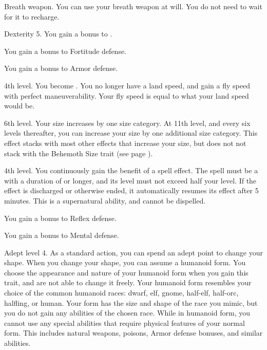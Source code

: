     \featpre Breath weapon.
    \featben You can use your breath weapon at will.
    You do not need to wait for it to recharge.

    \featpre Dexterity 5.
    \featben You gain a  bonus to .

    \featben You gain a  bonus to Fortitude defense.

    \featben You gain a  bonus to Armor defense.

    \featpre 4th level.
    \featben You become .
    You no longer have a land speed, and gain a fly speed with perfect maneuverability.
    Your fly speed is equal to what your land speed would be.

    \featpre 6th level.
    \featben Your size increases by one size category.
    At 11th level, and every six levels thereafter, you can increase your size by one additional size category.
    This effect stacks with most other effects that increase your size, but does not not stack with the Behemoth Size trait (see page ).

    \featpre 4th level.
    \featben You continuously gain the benefit of a spell effect.
    The spell must be a  with a duration of \durshort or longer, and its level must not exceed half your level.
    If the effect is discharged or otherwise ended, it automatically resumes its effect after 5 minutes.
    This is a supernatural ability, and cannot be dispelled.

    \featben You gain a  bonus to Reflex defense.

    \featben You gain a  bonus to Mental defense.

    \featpre Adept level 4.
    \featben As a standard action, you can spend an adept point to change your shape.
    When you change your shape, you can assume a humanoid form.
    You choose the appearance and nature of your humanoid form when you gain this trait, and are not able to change it freely.
    Your humanoid form resembles your choice of the common humanoid races: dwarf, elf, gnome, half-elf, half-orc, halfling, or human.
    Your form has the size and shape of the race you mimic, but you do not gain any abilities of the chosen race.
    While in humanoid form, you cannot use any special abilities that require physical features of your normal form.
    This includes natural weapons, poisons, Armor defense bonuses, and similar abilities.

